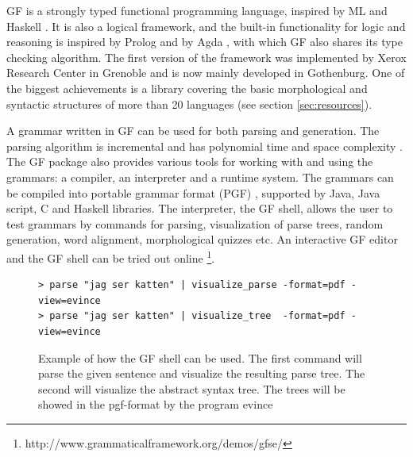 \documentclass{report}
\begin{document}
GF is a strongly typed functional programming language, inspired by
ML \cite{ml} and Haskell \cite{haskell}. It is also a logical framework,
and the built-in functionality for logic and reasoning 
is inspired by \textlambda Prolog \cite{prolog} and 
by Agda \cite{agda}, with which GF also shares its type checking algorithm.
The first version of the framework was implemented by Xerox Research Center
in Grenoble and is now mainly developed in Gothenburg. One of the biggest
achievements is a library covering the 
basic morphological and syntactic structures of more than
20 languages (see section \ref{sec:resources}).


A grammar written in GF can be used for both parsing and generation.
The parsing algorithm is incremental and has polynomial time and space
complexity \cite{gfMech}. 
The GF package also provides various tools for working with and using the grammars:
a compiler, an interpreter and a runtime system.
The grammars can be compiled into portable grammar format (PGF) \cite{pgf},
supported by %
Java, Java script, C and Haskell libraries. 
The interpreter, the GF shell, allows
the user to test grammars by commands for parsing, visualization of parse trees,
random generation, word alignment, morphological quizzes etc.
An interactive GF editor and the GF shell can be tried out online 
\footnote{http://www.grammaticalframework.org/demos/gfse/}.
\begin{figure}[h]
\begin{verbatim} 
> parse "jag ser katten" | visualize_parse -format=pdf -view=evince
> parse "jag ser katten" | visualize_tree  -format=pdf -view=evince
\end{verbatim}
\caption{Example of how the GF shell can be used. The first command will parse the given
sentence and visualize the resulting parse tree. The second will visualize the 
abstract syntax tree. The trees will be showed in the pgf-format by the program evince}
\label{fig:shellvp}
\end{figure}
\end{document}
